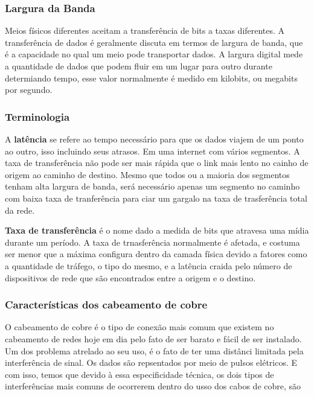 \documentclass[12pt a4paper]{paper}
\begin{document}
\subsubsection{Largura da Banda} %
\label{sec:Largura da Banda}
Meios físicos diferentes aceitam a transferência de bits a taxas diferentes. A 
transferência de dados é geralmente discuta em termos de largura de banda, que é a capacidade no qual um meio pode transportar dados. A largura digital mede a quantidade de dados que podem fluir em um lugar para outro durante determiando tempo, esse valor normalmente é medido em kilobits, ou megabits por segundo.

\subsubsection{Terminologia} %
\label{sec:Terminologia}
A \textbf{latência} se refere ao tempo necessário para que os dados viajem de um ponto 
ao outro, isso incluindo seus atrasos. Em uma internet com vários segmentos. A taxa 
de transferência não pode ser mais rápida que o link mais lento no cainho de origem 
ao caminho de destino. Mesmo que todos ou a maioria dos segmentos tenham alta largura 
de banda, será necessário apenas um segmento no caminho com baixa taxa de tranferência 
para ciar um gargalo na taxa de trasferência total da rede. 

\textbf{Taxa de transferência} é o nome dado a medida de bits que atravesa uma mídia 
durante um período. A taxa de trnasferência normalmente é afetada, e costuma ser menor 
que a máxima configura dentro da camada física devido a fatores como a quantidade de 
tráfego, o tipo do mesmo, e a latência craida pelo número de dispositivos de rede 
que são encontrados entre a origem e o destino. 

\subsubsection{Características dos cabeamento de cobre} %
\label{sec:Características dos cabeamento de cobre}
O cabeamento de cobre é o tipo de conexão mais comum que existem no cabeamento de redes 
hoje em dia pelo fato de ser barato e fácil de ser instalado. Um dos problema atrelado 
ao seu uso, é o fato de ter uma distânci limitada pela interferência de sinal. 
Os dados são repsentados por meio de pulsos elétricos. E com isso, temos que devido 
à essa especificidade técnica, os dois tipos de interferências mais comuns de 
ocorrerem dentro do usso dos cabos de cobre, são 
\end{document}
